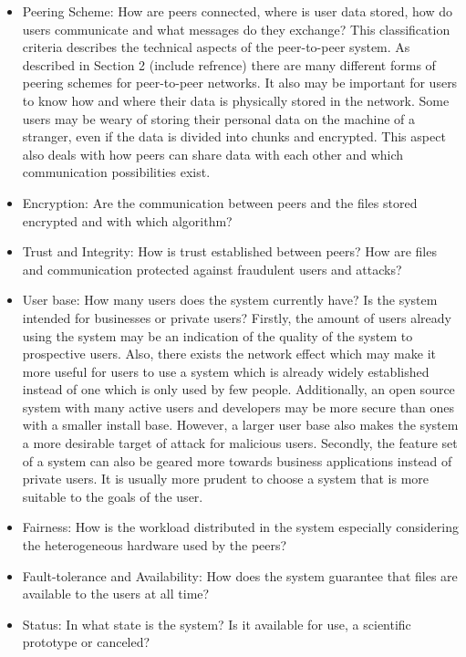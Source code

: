 \begin{itemize}
\item Peering Scheme: How are peers connected, where is user data stored, how do users communicate and what messages do they exchange?
This classification criteria describes the technical aspects of the peer-to-peer system. As described in Section 2 (include refrence) there are many different forms of peering schemes for peer-to-peer networks. It also may be important for users to know how and where their data is physically stored in the network. Some users may be weary of storing their personal data on the machine of a stranger, even if the data is divided into chunks and encrypted. This aspect also deals with how peers can share data with each other and which communication possibilities exist. 

\item Encryption: Are the communication between peers and the files stored encrypted and with which algorithm?

\item Trust and Integrity: How is trust established between peers? How are files and communication protected against fraudulent users and attacks?

\item User base: How many users does the system currently have? Is the system intended for businesses or private users?
Firstly, the amount of users already using the system may be an indication of the quality of the system to prospective users. Also, there exists the network effect which may make it more useful for users to use a system which is already widely established instead of one which is only used by few people. Additionally, an open source system with many active users and developers may be more secure than ones with a smaller install base. However, a larger user base also makes the system a more desirable target of attack for malicious users. Secondly, the feature set of a system can also be geared more towards business applications instead of private users. It is usually more prudent to choose a system that is more suitable to the goals of the user.

\item Fairness: How is the workload distributed in the system especially considering the heterogeneous hardware used by the peers?

\item Fault-tolerance and Availability: How does the system guarantee that files are available to the users at all time?

\item Status: In what state is the system? Is it available for use, a scientific prototype or canceled?
\end{itemize}

